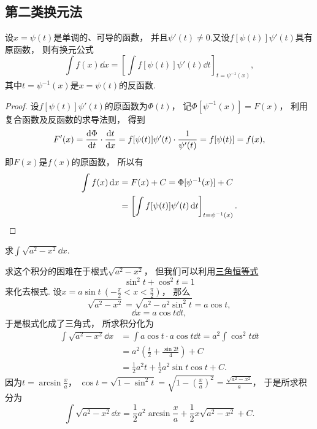 \subsection{第二类换元法}
\begin{theorem}
设\(x = \psi(t)\)是单调的、可导的函数，
并且\(\psi'(t) \neq 0\).又设\(f[\psi(t)] \psi'(t)\)具有原函数，
则有换元公式\begin{equation*}
	\int f(x) \dd{x}
	= \left[ \int f[\psi(t)] \psi'(t) \dd{t} \right]_{t=\psi^{-1}(x)},
\end{equation*}
其中\(t=\psi^{-1}(x)\)是\(x=\psi(t)\)的反函数.
\begin{proof}
设\(f[\psi(t)] \psi'(t)\)的原函数为\(\Phi(t)\)，
记\(\Phi[\psi^{-1}(x)] = F(x)\)，
利用复合函数及反函数的求导法则，
得到\begin{equation*}
	F'(x) = \dv{\Phi}{t} \cdot \dv{t}{x}
	= f[\psi(t)] \psi'(t) \cdot \frac{1}{\psi'(t)}
	= f[\psi(t)] = f(x),
\end{equation*}
即\(F(x)\)是\(f(x)\)的原函数，
所以有\begin{align*}
	\int f(x) \dd{x} &= F(x) + C
	= \Phi[\psi^{-1}(x)] + C \\
	&= \left[ \int f[\psi(t)] \psi'(t) \dd{t} \right]_{t=\psi^{-1}(x)}.
	\qedhere
\end{align*}
\end{proof}
\end{theorem}

\begin{example}
求\(\int \sqrt{a^2 - x^2} \dd{x}\).
\begin{solution}
求这个积分的困难在于根式\(\sqrt{a^2-x^2}\)，
但我们可以利用\hyperref[equation:三角函数.毕达哥拉斯三角恒等式1]{三角恒等式}\begin{equation*}
	\sin^2 t + \cos^2 t = 1
\end{equation*}来化去根式.
设\(x = a \sin t\ (-\frac\pi2 < x < \frac\pi2)\)，
那么\begin{equation*}
	\sqrt{a^2 - x^2}
	= \sqrt{a^2 - a^2 \sin^2 t}
	= a \cos t,
\end{equation*}\begin{equation*}
	\dd{x}
	= a \cos t \dd{t},
\end{equation*}
于是根式化成了三角式，
所求积分化为\begin{align*}
	\int \sqrt{a^2 - x^2} \dd{x}
	&= \int a \cos t \cdot a \cos t \dd{t}
	= a^2 \int \cos^2 t \dd{t} \\
	&= a^2 \left( \frac{t}{2} + \frac{\sin 2t}{4} \right) + C \\
	&= \frac{1}{2} a^2 t + \frac{1}{2} a^2 \sin t \cos t + C.
\end{align*}
因为\(t = \arcsin\frac{x}{a}\)，
\(\cos t
= \sqrt{1-\sin^2 t}
= \sqrt{1-\left(\frac{x}{a}\right)^2}
= \frac{\sqrt{a^2-x^2}}{a}\)，
于是所求积分为\begin{equation*}
	\int \sqrt{a^2 - x^2} \dd{x}
	= \frac{1}{2} a^2 \arcsin\frac{x}{a} + \frac{1}{2} x \sqrt{a^2 - x^2} + C.
\end{equation*}
\end{solution}
\end{example}

